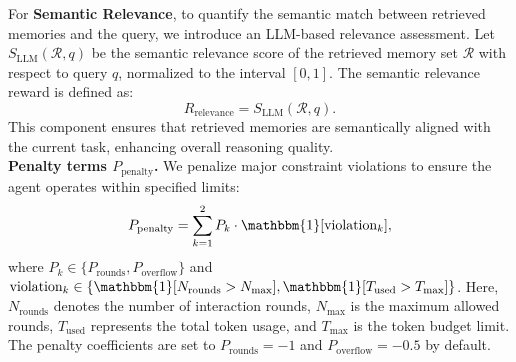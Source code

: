 For \textbf{Semantic Relevance}, to quantify the semantic match between retrieved memories and the query, we introduce an LLM-based relevance assessment. Let $S_{\text{LLM}}(\mathcal{R}, q)$ be the semantic relevance score of the retrieved memory set $\mathcal{R}$ with respect to query $q$, normalized to the interval $[0, 1]$. The semantic relevance reward is defined as:
\begin{equation}
R_{\text{relevance}} = S_{\text{LLM}}(\mathcal{R}, q).
\end{equation}
This component ensures that retrieved memories are semantically aligned with the current task, enhancing overall reasoning quality.
\\
\textbf{Penalty terms \(P_{\text{penalty}}\).}
We penalize major constraint violations to ensure the agent operates within specified limits:
\begin{equation}
P_{\text{penalty}} = \sum_{k=
1}^{2} P_k \cdot \mathbbm{1}[\text{violation}_k],
\end{equation}
where $P_k \in \{P_{\text{rounds}}, P_{\text{overflow}}\}$ and $\text{violation}_k \in \{\mathbbm{1}[N_{\text{rounds}} > N_{\max}], \mathbbm{1}[T_{\text{used}} > T_{\max}]\}$. Here, $N_{\text{rounds}}$ denotes the number of interaction rounds, $N_{\max}$ is the maximum allowed rounds, $T_{\text{used}}$ represents the total token usage, and $T_{\text{max}}$ is the token budget limit. The penalty coefficients are set to $P_{\text{rounds}} = -1$ and $P_{\text{overflow}} = -0.5$ by default.




